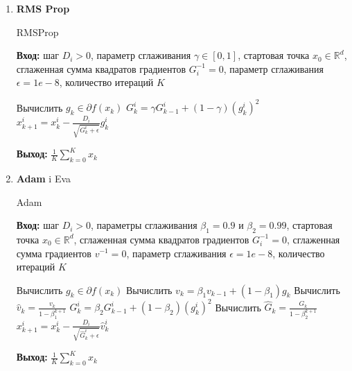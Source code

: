 \begin{enumerate}
    \item \textbf{RMS Prop}
          \begin{algorithm}[H]
              \caption{RMSProp}
              \textbf{Вход:} шаг $D_i > 0$, параметр сглаживания $\gamma \in [0, 1]$, стартовая точка $x_0 \in \mathbb{R}^d$, сглаженная сумма квадратов градиентов $G_i^{-1} = 0$, параметр сглаживания $\epsilon = 1e-8$, количество итераций $K$
              \begin{algorithmic}[1]
                  \State Вычислить $g_k \in \partial f(x_k)$
                  \State $G_k^i = \gamma G_{k-1}^i + (1 - \gamma)(g_k^i)^2$
                  \EndFor
                  \State $x_{k+1}^i = x_k^i - \frac{D_i}{\sqrt{G_k^i + \epsilon}} g_k^i$
                  \EndFor
                  \EndFor
              \end{algorithmic}
              \textbf{Выход:} $\frac{1}{K} \sum_{k=0}^K x_k$
          \end{algorithm}

    \item \textbf{Adam} i Eva
          \begin{algorithm}[H]
              \caption{Adam}
              \textbf{Вход:} шаг $D_i > 0$, параметры сглаживания $\beta_1 = 0.9$ и $\beta_2 = 0.99$, стартовая точка $x_0 \in \mathbb{R}^d$, сглаженная сумма квадратов градиентов $G_i^{-1} = 0$, сглаженная сумма градиентов $v^{-1} = 0$, параметр сглаживания $\epsilon = 1e-8$, количество итераций $K$
              \begin{algorithmic}[1]
                  \State Вычислить $g_k \in \partial f(x_k)$
                  \State Вычислить $v_k = \beta_1 v_{k-1} + (1 - \beta_1) g_k$
                  \State Вычислить $\hat{v}_k = \frac{v_k}{1 - \beta_1^{k+1}}$
                  \State $G_k^i = \beta_2 G_{k-1}^i + (1 - \beta_2) (g_k^i)^2$
                  \EndFor
                  \State Вычислить $\hat{G}_k = \frac{G_k}{1 - \beta_2^{k+1}}$
                  \State $x_{k+1}^i = x_k^i - \frac{D_i}{\sqrt{\hat{G}_k^i + \epsilon}} \hat{v}_k^i$
                  \EndFor
                  \EndFor
              \end{algorithmic}
              \textbf{Выход:} $\frac{1}{K} \sum_{k=0}^K x_k$
          \end{algorithm}


\end{enumerate}
